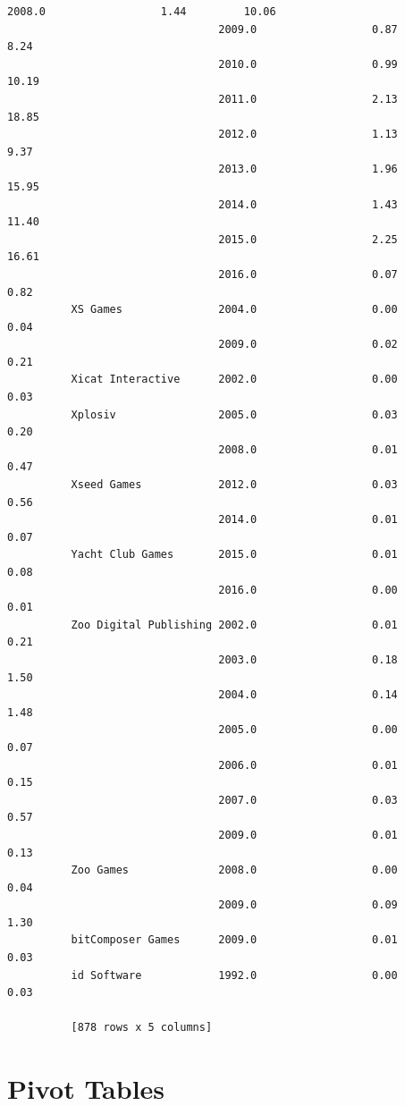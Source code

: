 \documentclass[11pt]{article}
\begin{document}
\begin{Verbatim}[commandchars=\\\{\}]
                                 2008.0                  1.44         10.06  
                                 2009.0                  0.87          8.24  
                                 2010.0                  0.99         10.19  
                                 2011.0                  2.13         18.85  
                                 2012.0                  1.13          9.37  
                                 2013.0                  1.96         15.95  
                                 2014.0                  1.43         11.40  
                                 2015.0                  2.25         16.61  
                                 2016.0                  0.07          0.82  
          XS Games               2004.0                  0.00          0.04  
                                 2009.0                  0.02          0.21  
          Xicat Interactive      2002.0                  0.00          0.03  
          Xplosiv                2005.0                  0.03          0.20  
                                 2008.0                  0.01          0.47  
          Xseed Games            2012.0                  0.03          0.56  
                                 2014.0                  0.01          0.07  
          Yacht Club Games       2015.0                  0.01          0.08  
                                 2016.0                  0.00          0.01  
          Zoo Digital Publishing 2002.0                  0.01          0.21  
                                 2003.0                  0.18          1.50  
                                 2004.0                  0.14          1.48  
                                 2005.0                  0.00          0.07  
                                 2006.0                  0.01          0.15  
                                 2007.0                  0.03          0.57  
                                 2009.0                  0.01          0.13  
          Zoo Games              2008.0                  0.00          0.04  
                                 2009.0                  0.09          1.30  
          bitComposer Games      2009.0                  0.01          0.03  
          id Software            1992.0                  0.00          0.03  
          
          [878 rows x 5 columns]
\end{Verbatim}
            
    \section{Pivot Tables}\label{pivot-tables}
\end{document}
